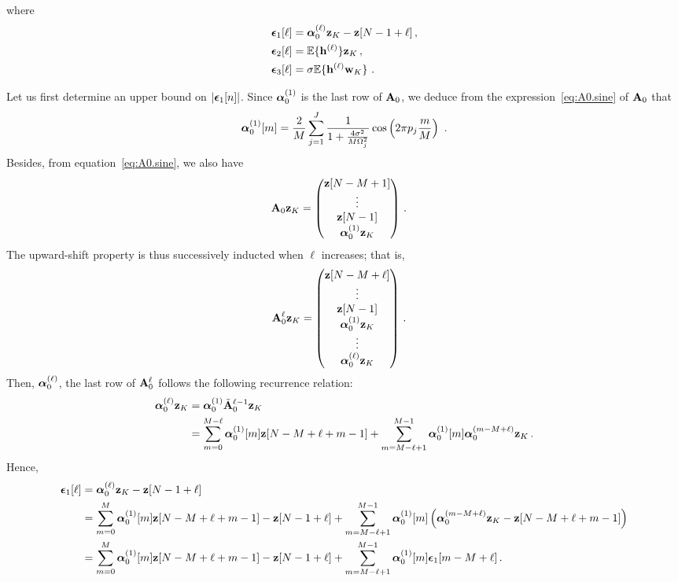 \documentclass[journal,onecolumn]{IEEEtran}
\begin{document}
where
\begin{align}
\label{eq:eps1.def}
\bepsilon_1[\ell]&=  \balpha_0^{(\ell)}\bz_{K}  - \bz[N-1+\ell]\,, \\
\label{eq:eps2.def}
\bepsilon_2[\ell] &=  \EE\{\bh^{(\ell)}\}\bz_{K}\,,  \\
\label{eq:eps3.def}
\bepsilon_3[\ell] &=  \sigma\EE\{\bh^{(\ell)}\bw_{K}\}  \ .
\end{align}

Let us first determine an upper bound on $\left|\boldsymbol{\epsilon}_1[n]\right|$.  Since $\boldsymbol{\alpha}_0^{(1)}$ is the last row of ${\mathbf A}_0$, we deduce from the expression~\eqref{eq:A0.sine} of ${\mathbf A}_0$ that
\begin{equation}
\balpha_0^{(1)}[m]  =\dfrac2M \sum_{j=1}^J\dfrac{1}{1+\frac{4\sigma^2}{M\Omega_j^2}}\cos\left(2\pi p_j\frac{m}{M}\right) \ . 
\label{eq:alpha01}
\end{equation}
Besides, from equation~\eqref{eq:A0.sine}, we also have
\begin{align*}
{\mathbf A}_0{\mathbf z}_{K} &= 
\begin{pmatrix}
{\mathbf z}[N-M+1] \\
\vdots \\
{\mathbf z}[N-1] \\
\boldsymbol{\alpha}_0^{(1)}{\mathbf z}_K
\end{pmatrix}\,.
\end{align*}
The upward-shift property is thus successively inducted when $\ell$ increases; that is,
\begin{align*}
{\mathbf A}_0^{\ell}{\mathbf z}_{K} &= 
\begin{pmatrix}
{\mathbf z}[N-M+\ell] \\
\vdots \\
{\mathbf z}[N-1] \\
\boldsymbol{\alpha}_0^{(1)}{\mathbf z}_K \\
\vdots \\
\boldsymbol{\alpha}_0^{(\ell)}{\mathbf z}_K
\end{pmatrix}
\, .
\end{align*}
Then, $\boldsymbol{\alpha}_0^{(\ell)}$, the last row of ${\mathbf A}_0^\ell$ follows the following recurrence relation:
\begin{align*}
\boldsymbol{\alpha}_0^{(\ell)}{\mathbf z}_{K} &= \boldsymbol{\alpha}_0^{(1)}\tilde{{\mathbf A}}_0^{\ell-1}{\mathbf z}_{K} \\
&=\sum_{m=0}^{M-\ell}\boldsymbol{\alpha}_0^{(1)}[m]{\mathbf z}[N-M+\ell+m-1]+\sum_{m=M-\ell+1}^{M-1}\boldsymbol{\alpha}_0^{(1)}[m]\boldsymbol{\alpha}_0^{(m-M+\ell)}{\mathbf z}_K\,.
\end{align*}
Hence,
\begin{align*}
\boldsymbol{\epsilon}_1[\ell] &= \boldsymbol{\alpha}_0^{(\ell)}{\mathbf z}_{K} - {\mathbf z}[N-1+\ell] \\
&=\sum_{m=0}^{M}\boldsymbol{\alpha}_0^{(1)}[m]{\mathbf z}[N-M+\ell+m-1]  - {\mathbf z}[N-1+\ell] +\sum_{m=M-\ell+1}^{M-1}\boldsymbol{\alpha}_0^{(1)}[m]\left(\boldsymbol{\alpha}_0^{(m-M+\ell)}{\mathbf z}_K - {\mathbf z}[N-M+\ell+m-1]\right) \\
&=\sum_{m=0}^{M}\boldsymbol{\alpha}_0^{(1)}[m]{\mathbf z}[N-M+\ell+m-1]  - {\mathbf z}[N-1+\ell] +\sum_{m=M-\ell+1}^{M-1}\boldsymbol{\alpha}_0^{(1)}[m]\boldsymbol{\epsilon}_1[m-M+\ell]\,.
\end{align*}
\end{document}
